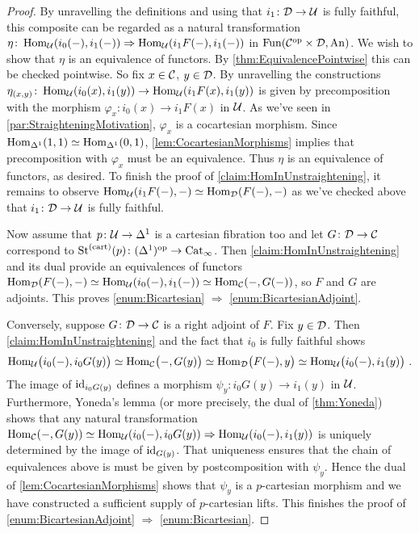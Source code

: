 \begin{proof}
	By unravelling the definitions and using that $i_1\colon \mathcal{D}\rightarrow \mathcal{U}$ is fully faithful, this composite can be regarded as a natural transformation $\eta\colon \operatorname{Hom}_{\mathcal{U}}(i_0(-),i_1(-))\Rightarrow \operatorname{Hom}_{\mathcal{U}}(i_1F(-),i_1(-))$ in $\operatorname{Fun}(\mathcal{C}^{\mathrm{op}}\times\mathcal{D},\mathrm{An})$. We wish to show that $\eta$ is an equivalence of functors. By \cref{thm:EquivalencePointwise} this can be checked pointwise. So fix $x\in \mathcal{C}$, $y\in\mathcal{D}$. By unravelling the constructions $\eta_{(x,y)}\colon \operatorname{Hom}_{\mathcal{U}}(i_0(x),i_1(y))\rightarrow \operatorname{Hom}_{\mathcal{U}}(i_1F(x),i_1(y))$ is given by precomposition with the morphism $\varphi_x\colon i_0(x)\rightarrow i_1F(x)$ in $\mathcal{U}$. As we've seen in \cref{par:StraighteningMotivation}, $\varphi_x$ is a cocartesian morphism. Since $\operatorname{Hom}_{\Delta^1}(1,1)\simeq \operatorname{Hom}_{\Delta^1}(0,1)$, \cref{lem:CocartesianMorphisms} implies that precomposition with $\varphi_x$ must be an equivalence. Thus $\eta$ is an equivalence of functors, as desired. To finish the proof of \cref{claim:HomInUnstraightening}, it remains to observe $\operatorname{Hom}_{\mathcal{U}}(i_1F(-),-)\simeq \operatorname{Hom}_{\mathcal{D}}(F(-),-)$ as we've checked above that $i_1\colon \mathcal{D}\rightarrow \mathcal{U}$ is fully faithful.
	
	Now assume that $p\colon \mathcal{U}\rightarrow \Delta^1$ is a cartesian fibration too and let $G\colon \mathcal{D}\rightarrow \mathcal{C}$ correspond to $\operatorname{St}^{(\mathrm{cart})}(p)\colon (\Delta^1)^{\mathrm{op}}\rightarrow \mathrm{Cat}_\infty$. Then \cref{claim:HomInUnstraightening} and its dual provide an equivalences of functors $\operatorname{Hom}_{\mathcal{D}}(F(-),-)\simeq \operatorname{Hom}_{\mathcal{U}}(i_0(-),i_1(-))\simeq \operatorname{Hom}_{\mathcal{C}}(-,G(-))$, so $F$ and $G$ are adjoints. This proves \cref{enum:Bicartesian} $\Rightarrow$ \cref{enum:BicartesianAdjoint}.
	
	Conversely, suppose $G\colon \mathcal{D}\rightarrow \mathcal{C}$ is a right adjoint of $F$. Fix $y\in \mathcal{D}$. Then \cref{claim:HomInUnstraightening} and the fact that $i_0$ is fully faithful shows
	\begin{equation*}
		\Hom_\Uu\lef(i_0(-),i_0G(y)\righ)\simeq \Hom_\Cc\lef(-,G(y)\righ)\simeq \Hom_\Dd\lef(F(-),y\righ)\simeq \Hom_\Uu\lef(i_0(-),i_1(y)\righ)\,.
	\end{equation*}
	The image of $\operatorname{id}_{i_0G(y)}$ defines a morphism $\psi_y\colon i_0G(y)\rightarrow i_1(y)$ in $\mathcal{U}$. Furthermore, Yoneda's lemma (or more precisely, the dual of \cref{thm:Yoneda}) shows that any natural transformation $\operatorname{Hom}_{\mathcal{C}}(-,G(y))\simeq \operatorname{Hom}_{\mathcal{U}}(i_0(-),i_0G(y))\Rightarrow \operatorname{Hom}_{\mathcal{U}}(i_0(-),i_1(y))$ is uniquely determined by the image of $\operatorname{id}_{G(y)}$. That uniqueness ensures that the chain of equivalences above is must be given by postcomposition with $\psi_y$. Hence the dual of \cref{lem:CocartesianMorphisms} shows that $\psi_y$ is a $p$-cartesian morphism and we have constructed a sufficient supply of $p$-cartesian lifts. This finishes the proof of \cref{enum:BicartesianAdjoint} $\Rightarrow$ \cref{enum:Bicartesian}.
\end{proof}
